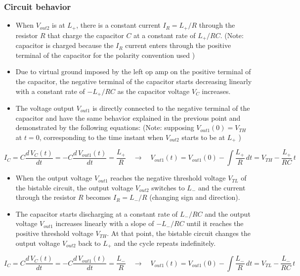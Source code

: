 \subsubsection*{Circuit behavior}
\begin{itemize}
	\item When \(V_{out2}\) is at \(L_+\), there is a constant current \(I_R = L_+ / R\) through the resistor \(R\) that charge
	the capacitor \(C\) at a constant rate of \(L_+ / RC\). (\footnotesize Note: capacitor is charged because the \(I_R\) current
	enters through the positive terminal of the capacitor for the polarity convention used \normalsize )
	\item Due to virtual ground imposed by the left op amp on the positive terminal of the capacitor, the negative terminal
	of the capacitor starts decreasing linearly with a constant rate of \(- L_+ / RC\) as the capacitor voltage \(V_C\)
	increases.
	\item The voltage output \(V_{out1}\) is directly connected to the negative terminal of the capacitor and have the same
	behavior explained in the previous point and demonstrated by the following equations:
	(\footnotesize Note: supposing \(V_{out1}(0) = V_{TH}\) at \(t=0\), corresponding to the time instant when \(V_{out2}\) starts to be at \(L_+\) \normalsize)
\end{itemize}
\vspace{5pt}
\[I_C = C \frac{d \, V_C(t)}{dt} = - C \frac{d \, V_{out1}(t)}{dt} = \frac{L_+}{R} \quad \rightarrow \quad V_{out1}(t) = V_{out1}(0) - \int \frac{L_+}{R} \, dt = V_{TH} - \frac{L_+}{RC} \, t\]
\vspace{0pt}

\begin{itemize}
	\item When the output voltage \(V_{out1}\) reaches the negative threshold voltage \(V_{TL}\) of the bistable circuit, the output
	voltage \(V_{out2}\) switches to \(L_-\) and the current through the resistor \(R\) becomes \(I_R = L_- / R\) (changing sign and
	direction).
	\item The capacitor starts discharging at a constant rate of \(L_- / RC\) and the output voltage \(V_{out1}\) increases linearly
	with a slope of \(-L_- / RC\) until it reaches the positive threshold voltage \(V_{TH}\). At that point, the bistable circuit
	changes the output voltage \(V_{out2}\) back to \(L_+\) and the cycle repeats indefinitely.
\end{itemize}
\vspace{5pt}
\[I_C = C \frac{d \, V_C(t)}{dt} = - C \frac{d \, V_{out1}(t)}{dt} = \frac{L_-}{R} \quad \rightarrow \quad V_{out1}(t) = V_{out1}(0) - \int \frac{L_-}{R} \, dt = V_{TL} - \frac{L_-}{RC} \, t\]
\vspace{0pt}

